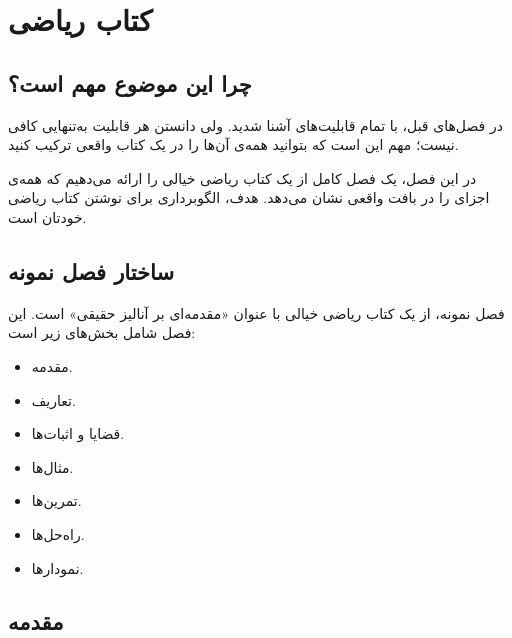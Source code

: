 
\chapter{کتاب ریاضی}
\label{chap:math-book}

\section{چرا این موضوع مهم است؟}
\label{sec:math-book-why}

در فصل‌های قبل، با تمام قابلیت‌های 
آشنا شدید. ولی دانستن هر قابلیت به‌تنهایی کافی
نیست؛ مهم این است که بتوانید همه‌ی آن‌ها را
در یک کتاب واقعی ترکیب کنید.

در این فصل، یک فصل کامل از یک کتاب ریاضی
خیالی را ارائه می‌دهیم که همه‌ی اجزای
 را در بافت واقعی نشان می‌دهد.
هدف، الگوبرداری برای نوشتن کتاب ریاضی خودتان
است.


\section{ساختار فصل نمونه}
\label{sec:math-book-structure}

فصل نمونه، از یک کتاب ریاضی خیالی با عنوان
«مقدمه‌ای بر آنالیز حقیقی» است. این فصل
شامل بخش‌های زیر است:

\begin{itemize}
    \item مقدمه.
    \item تعاریف.
    \item قضایا و اثبات‌ها.
    \item مثال‌ها.
    \item تمرین‌ها.
    \item راه‌حل‌ها.
    \item نمودارها.
\end{itemize}


\section{مقدمه}
\label{sec:math-book-intro}

